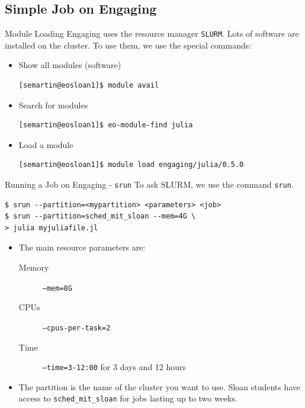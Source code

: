 \documentclass{beamer}
\begin{document}
\subsection{Simple Job on Engaging}

\begin{frame}[fragile]{Module Loading}
  Engaging uses the resource manager \alert{\texttt{SLURM}}. Lots of software are installed on the cluster. To use them, we use the special commands:
  \begin{itemize}
    \item Show all modules (software)
    \begin{verbatim}
[semartin@eosloan1]$ module avail
    \end{verbatim}
    \item Search for modules
    \begin{verbatim}
[semartin@eosloan1]$ eo-module-find julia
    \end{verbatim}
    \item Load a module
    \begin{verbatim}
[semartin@eosloan1]$ module load engaging/julia/0.5.0
    \end{verbatim}
  \end{itemize}

\end{frame}

\begin{frame}[fragile]{Running a Job on Engaging - \texttt{srun}}
  To ask SLURM, we use the command \alert{\texttt{srun}}.
  \begin{verbatim}
$ srun --partition=<mypartition> <parameters> <job>
$ srun --partition=sched_mit_sloan --mem=4G \
> julia myjuliafile.jl
  \end{verbatim}
  \begin{itemize}
    \item The main resource parameters are:
    \begin{description}
      \item[Memory] \texttt{--mem=8G}
      \item[CPUs] \texttt{--cpus-per-task=2}
      \item[Time] \texttt{--time=3-12:00} for 3 days and 12 hours
    \end{description}
    \item The partition is the name of the cluster you want to use. Sloan students have access to \texttt{sched\_mit\_sloan} for jobs lasting up to two weeks.
  \end{itemize}
\end{frame}
\end{document}
